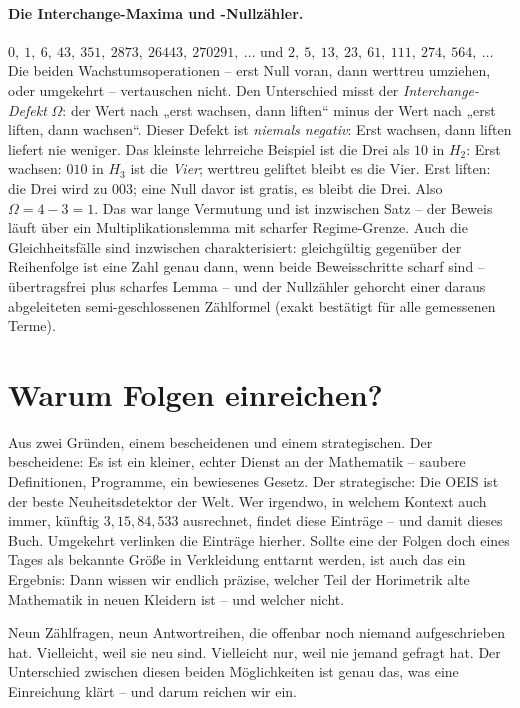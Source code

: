 \paragraph{Die Interchange-Maxima und -Nullzähler.}
$0,\ 1,\ 6,\ 43,\ 351,\ 2873,\ 26443,\ 270291,\ \ldots$ und
$2,\ 5,\ 13,\ 23,\ 61,\ 111,\ 274,\ 564,\ \ldots$
Die beiden Wachstumsoperationen -- erst Null voran, dann werttreu
umziehen, oder umgekehrt -- vertauschen nicht. Den Unterschied
misst der \emph{Interchange-Defekt} $\Omega$: der Wert nach „erst
wachsen, dann liften“ minus der Wert nach „erst liften, dann
wachsen“. Dieser Defekt ist \emph{niemals negativ}: Erst wachsen,
dann liften liefert nie weniger. Das kleinste
lehrreiche Beispiel ist die Drei als $10$ in $H_2$: Erst wachsen:
$010$ in $H_3$ ist die \emph{Vier}; werttreu geliftet bleibt es die
Vier. Erst liften: die Drei wird zu $003$; eine Null davor ist
gratis, es bleibt die Drei. Also $\Omega=4-3=1$. Das war lange Vermutung und ist inzwischen
Satz -- der Beweis läuft über ein Multiplikationslemma mit scharfer
Regime-Grenze. Auch die Gleichheitsfälle sind inzwischen
charakterisiert: gleichgültig gegenüber der Reihenfolge ist eine
Zahl genau dann, wenn beide Beweisschritte scharf sind --
übertragsfrei plus scharfes Lemma -- und der Nullzähler gehorcht
einer daraus abgeleiteten semi-geschlossenen Zählformel (exakt
bestätigt für alle gemessenen Terme).

\section{Warum Folgen einreichen?}

Aus zwei Gründen, einem bescheidenen und einem strategischen. Der
bescheidene: Es ist ein kleiner, echter Dienst an der Mathematik --
saubere Definitionen, Programme, ein bewiesenes Gesetz. Der
strategische: Die OEIS ist der beste Neuheitsdetektor der Welt.
Wer irgendwo, in welchem Kontext auch immer, künftig
$3, 15, 84, 533$ ausrechnet, findet diese Einträge -- und damit
dieses Buch. Umgekehrt verlinken die Einträge hierher. Sollte eine
der Folgen doch eines Tages als bekannte Größe in Verkleidung
enttarnt werden, ist auch das ein Ergebnis: Dann wissen wir endlich
präzise, welcher Teil der Horimetrik alte Mathematik in neuen
Kleidern ist -- und welcher nicht.

\begin{oberflaeche}
Neun Zählfragen, neun Antwortreihen, die offenbar noch niemand
aufgeschrieben hat. Vielleicht, weil sie neu sind. Vielleicht nur,
weil nie jemand gefragt hat. Der Unterschied zwischen diesen beiden
Möglichkeiten ist genau das, was eine Einreichung klärt -- und
darum reichen wir ein.
\end{oberflaeche}
